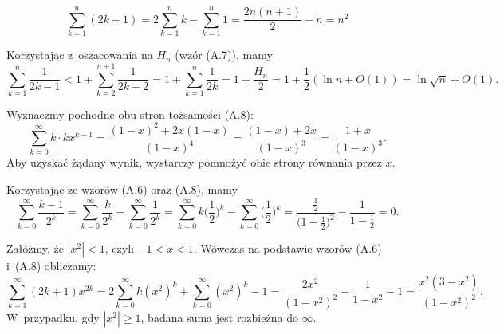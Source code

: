 
\exercise %
\[
	\sum_{k=1}^n(2k-1) = 2\sum_{k=1}^nk-\sum_{k=1}^n1 = \frac{2n(n+1)}{2}-n = n^2
\]

\exercise %
Korzystając z~oszacowania na $H_n$ (wzór (A.7)), mamy
\[
    \sum_{k=1}^n\frac{1}{2k-1} < 1+\sum_{k=2}^{n+1}\frac{1}{2k-2} = 1+\sum_{k=1}^n\frac{1}{2k} = 1+\frac{H_n}{2} = 1+\frac{1}{2}(\ln n+O(1)) = \ln\sqrt{n}+O(1).
\]

\exercise %
Wyznaczmy pochodne obu stron tożsamości (A.8):
\[
	\sum_{k=0}^\infty k\cdot kx^{k-1} = \frac{(1-x)^2+2x(1-x)}{(1-x)^4} = \frac{(1-x)+2x}{(1-x)^3} = \frac{1+x}{(1-x)^3}.
\]
Aby uzyskać żądany wynik, wystarczy pomnożyć obie strony równania przez $x$.

\exercise %
Korzystając ze wzorów (A.6) oraz (A.8), mamy
\[
	\sum_{k=0}^\infty\frac{k-1}{2^k} = \sum_{k=0}^\infty\frac{k}{2^k}-\sum_{k=0}^\infty\frac{1}{2^k} = \sum_{k=0}^\infty k\biggl(\frac{1}{2}\biggr)^k-\sum_{k=0}^\infty\biggl(\frac{1}{2}\biggr)^k = \frac{\frac{1}{2}}{\bigl(1-\frac{1}{2}\bigr)^2}-\frac{1}{1-\frac{1}{2}} = 0.
\]

\exercise %
Załóżmy, że $|x^2|<1$, czyli $-1<x<1$.
Wówczas na podstawie wzorów (A.6) i~(A.8) obliczamy:
\[
	\sum_{k=1}^\infty(2k+1)x^{2k} = 2\sum_{k=0}^\infty k(x^2)^k+\sum_{k=0}^\infty(x^2)^k-1 = \frac{2x^2}{(1-x^2)^2}+\frac{1}{1-x^2}-1 = \frac{x^2(3-x^2)}{(1-x^2)^2}.
\]
W~przypadku, gdy $|x^2|\ge1$, badana suma jest rozbieżna do $\infty$.


